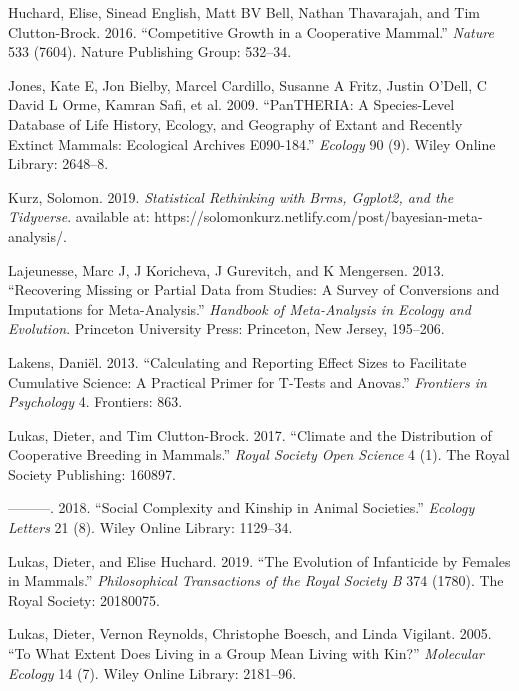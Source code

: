 \documentclass[]{article}
\begin{document}
\leavevmode\hypertarget{ref-huchard2016competitive}{}%
Huchard, Elise, Sinead English, Matt BV Bell, Nathan Thavarajah, and Tim
Clutton-Brock. 2016. ``Competitive Growth in a Cooperative Mammal.''
\emph{Nature} 533 (7604). Nature Publishing Group: 532--34.

\leavevmode\hypertarget{ref-jones2009pantheria}{}%
Jones, Kate E, Jon Bielby, Marcel Cardillo, Susanne A Fritz, Justin
O'Dell, C David L Orme, Kamran Safi, et al. 2009. ``PanTHERIA: A
Species-Level Database of Life History, Ecology, and Geography of Extant
and Recently Extinct Mammals: Ecological Archives E090-184.''
\emph{Ecology} 90 (9). Wiley Online Library: 2648--8.

\leavevmode\hypertarget{ref-kurz2019rethinking}{}%
Kurz, Solomon. 2019. \emph{Statistical Rethinking with Brms, Ggplot2,
and the Tidyverse}. available at:
https://solomonkurz.netlify.com/post/bayesian-meta-analysis/.

\leavevmode\hypertarget{ref-lajeunesse2013recovering}{}%
Lajeunesse, Marc J, J Koricheva, J Gurevitch, and K Mengersen. 2013.
``Recovering Missing or Partial Data from Studies: A Survey of
Conversions and Imputations for Meta-Analysis.'' \emph{Handbook of
Meta-Analysis in Ecology and Evolution}. Princeton University Press:
Princeton, New Jersey, 195--206.

\leavevmode\hypertarget{ref-lakens2013calculating}{}%
Lakens, Daniël. 2013. ``Calculating and Reporting Effect Sizes to
Facilitate Cumulative Science: A Practical Primer for T-Tests and
Anovas.'' \emph{Frontiers in Psychology} 4. Frontiers: 863.

\leavevmode\hypertarget{ref-lukas2017climate}{}%
Lukas, Dieter, and Tim Clutton-Brock. 2017. ``Climate and the
Distribution of Cooperative Breeding in Mammals.'' \emph{Royal Society
Open Science} 4 (1). The Royal Society Publishing: 160897.

\leavevmode\hypertarget{ref-lukas2018social}{}%
---------. 2018. ``Social Complexity and Kinship in Animal Societies.''
\emph{Ecology Letters} 21 (8). Wiley Online Library: 1129--34.

\leavevmode\hypertarget{ref-lukas2019evolution}{}%
Lukas, Dieter, and Elise Huchard. 2019. ``The Evolution of Infanticide
by Females in Mammals.'' \emph{Philosophical Transactions of the Royal
Society B} 374 (1780). The Royal Society: 20180075.

\leavevmode\hypertarget{ref-lukas2005extent}{}%
Lukas, Dieter, Vernon Reynolds, Christophe Boesch, and Linda Vigilant.
2005. ``To What Extent Does Living in a Group Mean Living with Kin?''
\emph{Molecular Ecology} 14 (7). Wiley Online Library: 2181--96.
\end{document}
